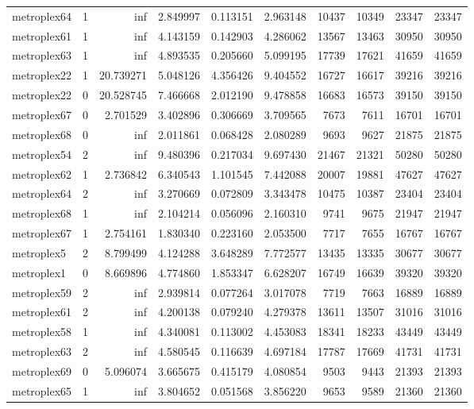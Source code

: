 \begin{longtable}{|l|r|r|r|r|r|r|r|r|r|}
metroplex64 & 1 & inf & 2.849997 & 0.113151 & 2.963148 & 10437 & 10349 & 23347 & 23347 \\
metroplex61 & 1 & inf & 4.143159 & 0.142903 & 4.286062 & 13567 & 13463 & 30950 & 30950 \\
metroplex63 & 1 & inf & 4.893535 & 0.205660 & 5.099195 & 17739 & 17621 & 41659 & 41659 \\
metroplex22 & 1 & 20.739271 & 5.048126 & 4.356426 & 9.404552 & 16727 & 16617 & 39216 & 39216 \\
metroplex22 & 0 & 20.528745 & 7.466668 & 2.012190 & 9.478858 & 16683 & 16573 & 39150 & 39150 \\
metroplex67 & 0 & 2.701529 & 3.402896 & 0.306669 & 3.709565 & 7673 & 7611 & 16701 & 16701 \\
metroplex68 & 0 & inf & 2.011861 & 0.068428 & 2.080289 & 9693 & 9627 & 21875 & 21875 \\
metroplex54 & 2 & inf & 9.480396 & 0.217034 & 9.697430 & 21467 & 21321 & 50280 & 50280 \\
metroplex62 & 1 & 2.736842 & 6.340543 & 1.101545 & 7.442088 & 20007 & 19881 & 47627 & 47627 \\
metroplex64 & 2 & inf & 3.270669 & 0.072809 & 3.343478 & 10475 & 10387 & 23404 & 23404 \\
metroplex68 & 1 & inf & 2.104214 & 0.056096 & 2.160310 & 9741 & 9675 & 21947 & 21947 \\
metroplex67 & 1 & 2.754161 & 1.830340 & 0.223160 & 2.053500 & 7717 & 7655 & 16767 & 16767 \\
metroplex5 & 2 & 8.799499 & 4.124288 & 3.648289 & 7.772577 & 13435 & 13335 & 30677 & 30677 \\
metroplex1 & 0 & 8.669896 & 4.774860 & 1.853347 & 6.628207 & 16749 & 16639 & 39320 & 39320 \\
metroplex59 & 2 & inf & 2.939814 & 0.077264 & 3.017078 & 7719 & 7663 & 16889 & 16889 \\
metroplex61 & 2 & inf & 4.200138 & 0.079240 & 4.279378 & 13611 & 13507 & 31016 & 31016 \\
metroplex58 & 1 & inf & 4.340081 & 0.113002 & 4.453083 & 18341 & 18233 & 43449 & 43449 \\
metroplex63 & 2 & inf & 4.580545 & 0.116639 & 4.697184 & 17787 & 17669 & 41731 & 41731 \\
metroplex69 & 0 & 5.096074 & 3.665675 & 0.415179 & 4.080854 & 9503 & 9443 & 21393 & 21393 \\
metroplex65 & 1 & inf & 3.804652 & 0.051568 & 3.856220 & 9653 & 9589 & 21360 & 21360 \\

\end{longtable}
